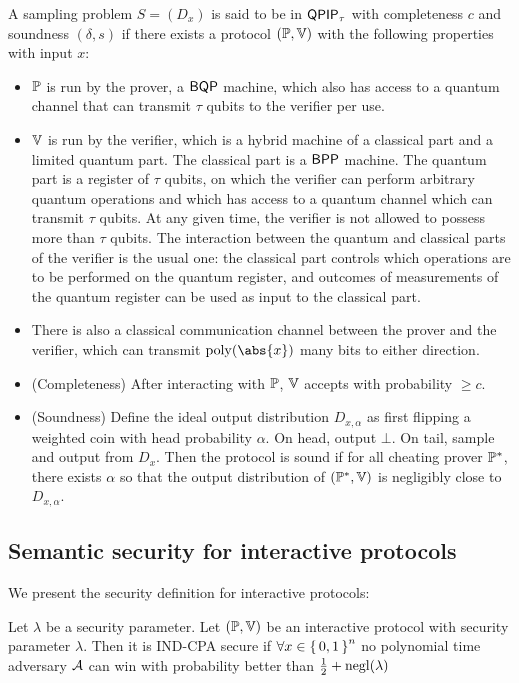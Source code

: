 \begin{definition} [$\BQP$]
\begin{definition}
	A sampling problem $S=(D_x)$ is said to be in $\operatorname{\mathsf{QPIP}}_\tau$ with completeness $c$ and soundness $(\delta, s)$ if there exists a protocol $(\mathbb{P}, \mathbb{V})$ with the following properties with input $x$:
	\begin{itemize}
		\item $\mathbb{P}$ is run by the prover, a $\BQP$ machine, which also has access to a quantum channel that can transmit $\tau$ qubits to the verifier per use.
		\item $\mathbb{V}$ is run by the verifier, which is a hybrid machine of a classical part and a limited quantum part. The classical part is a $\operatorname{\mathsf{BPP}}$ machine. The quantum part is a register of $\tau$ qubits, on which the verifier can perform arbitrary quantum operations and which has access to a quantum channel which can transmit $\tau$ qubits. At any given time, the verifier is not allowed to possess more than $\tau$ qubits. The interaction between the quantum and classical parts of the verifier is the usual one: the classical part controls which operations are to be performed on the quantum register, and outcomes of measurements of the quantum register can be used as input to the classical part.
		\item There is also a classical communication channel between the prover and the verifier, which can transmit $\poly(\abs{x})$ many bits to either direction. 
		\item (Completeness) After interacting with $\mathbb{P}$, $\mathbb{V}$ accepts with probability $\geq c$.
		\item (Soundness) Define the ideal output distribution $D_{x, \alpha}$ as first flipping a weighted coin with head probability $\alpha$. On head, output $\bot$. On tail, sample and output from $D_x$.
			Then the protocol is sound if for all cheating prover $\mathbb{P}^*$, there exists $\alpha$ so that the output distribution of $(\mathbb{P}^*, \mathbb{V})$ is negligibly close to $D_{x, \alpha}$.
	\end{itemize}
\end{definition}

\subsection{Semantic security for interactive protocols}

We present the security definition for interactive protocols:

\begin{dfn}
	Let $\lambda$ be a security parameter.
	Let $(\mathbb{P}, \mathbb{V})$ be an interactive protocol with security parameter $\lambda$.
	Then it is IND-CPA secure if $\forall x\in\set{0,1}^n$ no polynomial time adversary $\mathcal{A}$ can win  with probability better than $\frac{1}{2}+\operatorname{negl}(\lambda)$
\end{dfn}


\end{definition}

